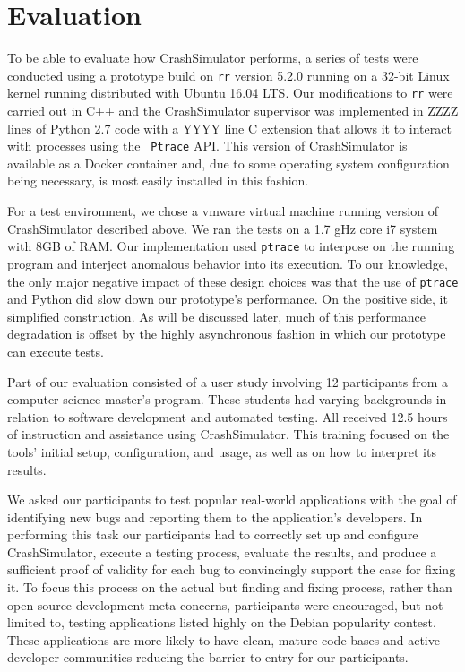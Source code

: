 \section{Evaluation}
\label{SEC:evaluation}

To be able to evaluate how CrashSimulator performs, a series of tests were
conducted using a prototype build on {\tt rr} version 5.2.0 running on a
32-bit Linux kernel running distributed with  Ubuntu 16.04 LTS.  Our
modifications to {\tt rr} were carried out in C++ and the CrashSimulator
supervisor was implemented in ZZZZ lines of Python 2.7 code with a YYYY
line C extension that allows it to interact with processes using the {\tt
Ptrace} API.  This version of CrashSimulator is available as a Docker
container and, due to some operating system configuration being necessary,
is most easily installed in this fashion.

For a test environment, we chose
a vmware virtual machine running version of CrashSimulator described above.
We ran the tests on a 1.7 gHz
core i7 system with 8GB of RAM. Our implementation used {\tt ptrace} to
interpose on the running program and interject anomalous behavior into its
execution.  To our knowledge, the only major negative impact of
these design choices was that the use of {\tt ptrace} and Python did slow
down our
prototype's performance.  On the positive side, it simplified construction.
As will be discussed later, much of this performance
degradation is offset by the highly asynchronous fashion in which our
prototype can execute tests.

Part of our evaluation consisted of a user study involving
12 participants from a computer science master's
program.  These students had varying backgrounds in relation to software
development and automated testing.  All received  12.5 hours
of instruction and assistance using CrashSimulator.
This training focused on the tools'
initial setup, configuration, and usage,
as well as on how to interpret its
results.

We asked our participants to test popular real-world applications with the
goal of identifying new bugs and reporting them to the application's
developers.  In performing this task our participants had to correctly set
up and configure CrashSimulator, execute a testing process, evaluate the
results, and produce a sufficient proof of validity for each bug to
convincingly support the case for fixing it.
To focus this process on the actual but finding and fixing
process, rather than open source development meta-concerns, participants
were encouraged, but not limited to, testing applications listed highly on
the Debian popularity contest.  These applications are more likely to have
clean, mature code bases and active developer communities reducing the
barrier to entry for our participants.

